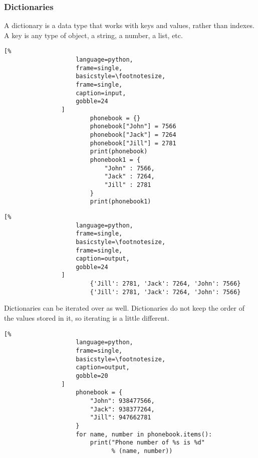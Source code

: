 \documentclass[crop=false,class=article,oneside]{standalone}
\begin{document}
        \subsubsection{Dictionaries}
            A dictionary is a data type that works with keys and
            values, rather than indexes. A key is any type of object,
            a string, a number, a list, etc.\newline
            \begin{minipage}[t]{.48\textwidth}
                \centering
                \begin{lstlisting}[%
                    language=python,
                    frame=single,
                    basicstyle=\footnotesize,
                    frame=single,
                    caption=input,
                    gobble=24
                ]
                        phonebook = {}
                        phonebook["John"] = 7566
                        phonebook["Jack"] = 7264
                        phonebook["Jill"] = 2781
                        print(phonebook)
                        phonebook1 = {
                            "John" : 7566,
                            "Jack" : 7264,
                            "Jill" : 2781
                        }
                        print(phonebook1)
                \end{lstlisting}
            \end{minipage}\hfill
            \begin{minipage}[t]{.48\textwidth}
                \centering
                \begin{lstlisting}[%
                    language=python,
                    frame=single,
                    basicstyle=\footnotesize,
                    frame=single,
                    caption=output,
                    gobble=24
                ]
                        {'Jill': 2781, 'Jack': 7264, 'John': 7566}
                        {'Jill': 2781, 'Jack': 7264, 'John': 7566}
                \end{lstlisting}
            \end{minipage}
            Dictionaries can be iterated over as well. Dictionaries
            do not keep the order of the values stored in it, so
            iterating is a little different.
            \newpage
            \begin{minipage}[t]{.48\textwidth}
                \centering
                \begin{lstlisting}[%
                    language=python,
                    frame=single,
                    basicstyle=\footnotesize,
                    caption=output,
                    gobble=20
                ]
                    phonebook = {
                        "John": 938477566,
                        "Jack": 938377264,
                        "Jill": 947662781
                    }
                    for name, number in phonebook.items():
                        print("Phone number of %s is %d"
                              % (name, number))
                \end{lstlisting}
            \end{minipage}\hfill
\end{document}
